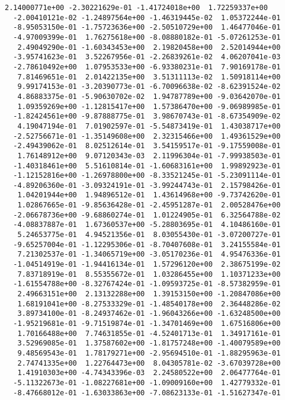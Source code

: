 \documentclass[11pt]{article}
\begin{document}
\begin{Verbatim}[commandchars=\\\{\}]
   2.14000771e+00 -2.30221629e-01 -1.41724018e+00  1.72259337e+00
  -2.00410121e-02 -1.24897564e+00 -1.46319445e-02  1.05372244e-01
  -8.95053150e-01 -1.75723636e+00 -2.50510729e+00  1.46477046e-01
  -4.97009399e-01  1.76275618e+00 -8.08880182e-01 -5.07261253e-01
   2.49049290e-01 -1.60343453e+00  2.19820458e+00  2.52014944e+00
  -3.95741623e-01  3.52267956e-01 -2.26839261e-02  4.06207041e-03
  -2.78610492e+00  1.07953533e+00 -6.93380231e-01  7.90169178e-01
   7.81469651e-01  2.01422135e+00  3.51311113e-02  1.50918114e+00
   9.99174153e-01 -3.20390773e-01 -6.70096638e-02 -8.62391524e-02
   4.86883375e-01 -5.90630702e-02  1.94787789e+00 -9.03642070e-01
   1.09359269e+00 -1.12815417e+00  1.57386470e+00 -9.06989985e-01
  -1.82424561e+00 -9.87888775e-01  3.98670743e-01 -8.67354909e-02
   4.19047194e-01  7.01902597e-01 -5.54873419e-01  1.43038717e+00
  -2.52756671e-01 -1.35149608e+00  2.32315466e+00  1.49361529e+00
  -2.49439062e-01  8.02512614e-01  3.54159517e-01 -9.17559008e-01
   1.76148912e+00  9.07120343e-03  2.11996304e-01 -7.99938503e-01
  -1.40318461e+00  5.51610814e-01 -1.60683161e+00  1.99892923e-01
  -1.12152816e+00 -1.26978800e+00 -8.33521245e-01 -5.23091114e-01
  -4.89206360e-01 -3.09324191e-01 -3.99244743e-01  2.15798426e-01
   1.04201944e+00  1.94896512e-01  1.43614968e+00 -9.73742620e-01
   1.02867665e-01 -9.85636428e-01 -2.45951287e-01  2.00528476e+00
  -2.06678736e+00 -9.68860274e-01  1.01224905e-01  6.32564788e-02
  -4.08837887e-01  1.67360537e+00 -5.28803695e-01  4.10486160e-01
   5.24653775e-01  4.94521356e-01  8.03055430e-01 -3.07200727e-01
  -9.65257004e-01 -1.12295306e-01 -8.70407608e-01  3.24155584e-01
   7.21302537e-01 -1.34065719e+00 -3.05170236e-01  4.95476336e-01
  -1.04514919e-01 -1.94416134e-01  1.57296120e+00  2.38675199e-02
   7.83718919e-01  8.55355672e-01  1.03286455e+00  1.10371233e+00
  -1.61554788e+00 -8.32767424e-01 -1.09593725e-01 -8.57382959e-01
   2.49663151e+00  2.13132288e+00  1.39153150e+00 -1.20847086e+00
   1.68191041e+00 -8.27533329e-01 -1.48540178e+00  2.36448286e-02
   3.89734100e-01 -8.24937462e-01 -1.96043266e+00 -1.63248500e+00
  -1.95219681e-01 -9.71519874e-01 -1.34701469e+00  1.67516806e+00
   1.70166488e+00  7.74631855e-01 -4.52401713e-01  1.34917161e-01
   3.52969085e-01  1.37587602e+00 -1.81757248e+00 -1.40079589e+00
   9.48569543e-01  1.78179271e+00 -2.95694510e-01 -1.88295963e-01
   2.74741335e+00  1.22764473e+00  8.04305781e-02 -3.67039728e+00
   1.41910303e+00 -4.74343396e-03  2.24580522e+00  2.06477764e-01
  -5.11322673e-01 -1.08227681e+00 -1.09009160e+00  1.42779332e-01
  -8.47668012e-01 -1.63033863e+00 -7.08623133e-01 -1.51627347e-01

\end{Verbatim}
\end{document}
